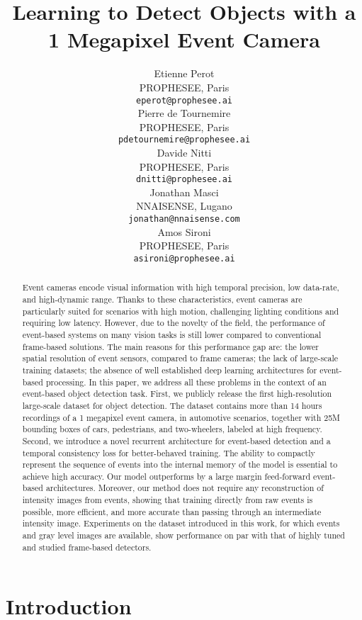 \documentclass{article}
\title{Learning to Detect Objects with a 1 Megapixel Event Camera}
\author{Etienne Perot\\
   PROPHESEE, Paris\\
   \texttt{eperot@prophesee.ai}\\
   \And
   Pierre de Tournemire\\
   PROPHESEE, Paris\\
   \texttt{pdetournemire@prophesee.ai}\\
   \AND
   Davide Nitti\\
   PROPHESEE, Paris\\
   \texttt{dnitti@prophesee.ai}\\
   \And
   Jonathan Masci\\
   NNAISENSE, Lugano\\
   \texttt{jonathan@nnaisense.com}\\
   \And
   Amos Sironi\\
   PROPHESEE, Paris\\
   \texttt{asironi@prophesee.ai}\\
}
\begin{document}
\maketitle


\begin{abstract}
    Event cameras encode visual
    information with high temporal precision, 
    low data-rate, and high-dynamic range. 
    Thanks to these characteristics, event cameras 
    are particularly suited for scenarios with high motion, 
    challenging lighting conditions and requiring low latency. 
    However, due to the novelty of the field, 
    the performance of event-based systems 
    on many vision tasks
    is still lower compared to conventional frame-based solutions.
    The main reasons for this performance gap are: the lower spatial resolution of event sensors, 
    compared to frame cameras; the lack of large-scale training datasets;
    the absence of well established deep learning architectures for event-based processing. 
    In this paper, we address all these problems in the context of an event-based object detection task.
    First, we publicly release the first high-resolution large-scale dataset for object detection.
    The dataset contains more than 14 hours recordings of a 1 megapixel event camera,
    in automotive scenarios, together with 25M bounding boxes of cars, pedestrians, and two-wheelers, 
    labeled at high frequency.
Second, we introduce a novel recurrent architecture for event-based detection
    and a temporal consistency loss for better-behaved training.
    The ability to compactly represent the sequence of events into the internal memory
    of the model is essential to achieve high accuracy. Our model outperforms by a 
    large margin feed-forward event-based architectures.
    Moreover, our method does not require any reconstruction 
    of intensity images from events, 
    showing that training directly from raw events is possible,
    more efficient, and more accurate than 
    passing through an intermediate intensity image. 
Experiments on the dataset introduced in this work, for which events
    and gray level images are available, show performance on par with that of
    highly tuned and studied frame-based detectors.


    \end{abstract}
     
\section{Introduction}
\end{document}
